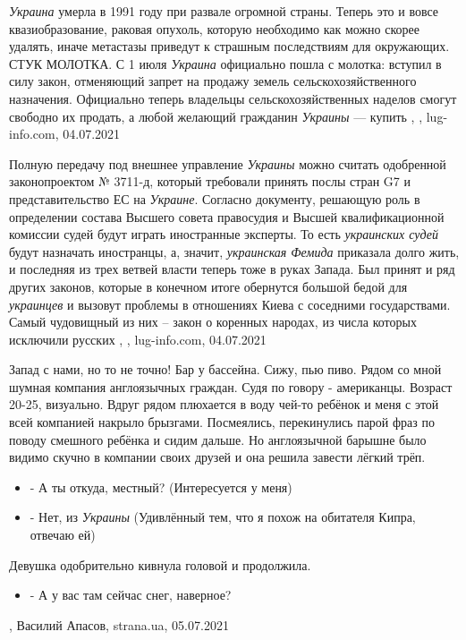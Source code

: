 \emph{Украина} умерла в 1991 году при развале огромной страны. Теперь это и
вовсе квазиобразование, раковая опухоль, которую необходимо как можно скорее
удалять, иначе метастазы приведут к страшным последствиям для окружающих.  СТУК
МОЛОТКА.  С 1 июля \emph{Украина} официально пошла с молотка: вступил в силу
закон, отменяющий запрет на продажу земель сельскохозяйственного назначения.
Официально теперь владельцы сельскохозяйственных наделов смогут свободно их
продать, а любой желающий гражданин \emph{Украины} — купить
, , lug-info.com, 04.07.2021

Полную передачу под внешнее управление \emph{Украины} можно считать одобренной
законопроектом № 3711-д, который требовали принять послы стран G7 и
представительство ЕС на \emph{Украине}. Согласно документу, решающую роль в
определении состава Высшего совета правосудия и Высшей квалификационной
комиссии судей будут играть иностранные эксперты. То есть \emph{украинских судей}
будут назначать иностранцы, а, значит, \emph{украинская Фемида} приказала долго жить,
и последняя из трех ветвей власти теперь тоже в руках Запада.  Был принят и ряд
других законов, которые в конечном итоге обернутся большой бедой для \emph{украинцев}
и вызовут проблемы в отношениях Киева с соседними государствами. Самый
чудовищный из них – закон о коренных народах, из числа которых исключили
русских
, , lug-info.com, 04.07.2021

Запад с нами, но то не точно!  Бар у бассейна. Сижу, пью пиво. Рядом со мной
шумная компания англоязычных граждан. Судя по говору - американцы. Возраст
20-25, визуально.
Вдруг рядом плюхается в воду чей-то ребёнок и меня с этой всей компанией
накрыло брызгами. Посмеялись, перекинулись парой фраз по поводу смешного
ребёнка и сидим дальше. Но англоязычной барышне было видимо скучно в компании
своих друзей и она решила завести лёгкий трёп.
\begin{itemize}
  \item - А ты откуда, местный? (Интересуется у меня)
  \item - Нет, из \emph{Украины} (Удивлённый тем, что я похож на обитателя Кипра, отвечаю ей)
\end{itemize}
Девушка одобрительно кивнула головой и продолжила.
\begin{itemize}
  \item - А у вас там сейчас снег, наверное?
\end{itemize}
, 
Василий Апасов, strana.ua, 05.07.2021

